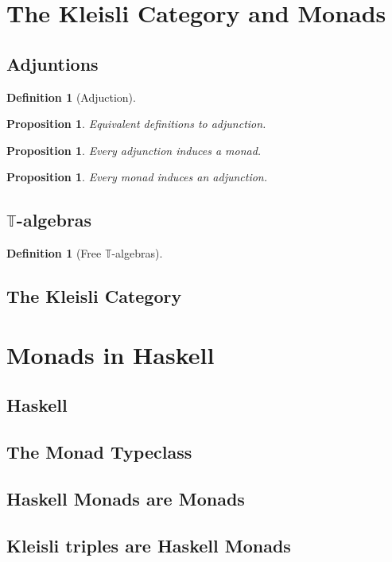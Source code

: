 \documentclass[a4paper]{article}
\theoremstyle{plain}
\newtheorem{proposition}[theorem]{Proposition}
\theoremstyle{definition}
\newtheorem{definition}[theorem]{Definition}
\newcommand{\cat}[1]{\mathcal{#1}}
\begin{document}

\section{The Kleisli Category and Monads}
\subsection{Adjuntions}
\begin{definition}[Adjuction]
\end{definition}
\begin{proposition}
    Equivalent definitions to adjunction.
\end{proposition}
\begin{proposition}
    Every adjunction induces a monad.
\end{proposition}
\begin{proposition}
    Every monad induces an adjunction.
\end{proposition}
\subsection{$\mathbb{T}$-algebras}
\begin{definition}[Free $\mathbb{T}$-algebras]
\end{definition}
\subsection{The Kleisli Category}

\section{Monads in Haskell}
\subsection{Haskell}
\subsection{The Monad Typeclass}
\subsection{Haskell Monads are Monads}
\subsection{Kleisli triples are Haskell Monads}
\end{document}
